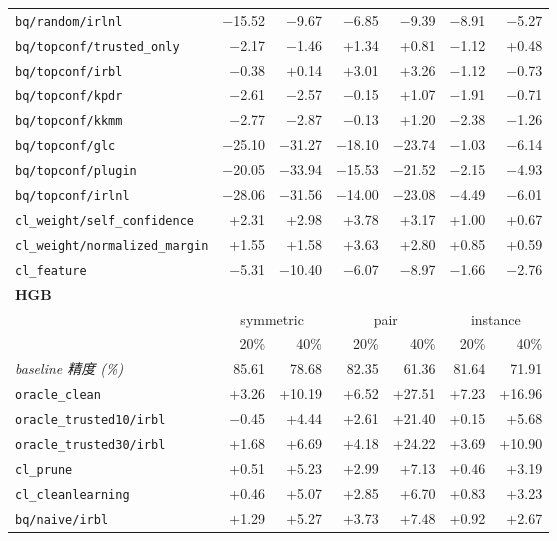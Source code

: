 \begin{tabular}{lrrrrrr}
\texttt{bq/random/irlnl} & $-$15.52 & $-$9.67 & $-$6.85 & $-$9.39 & $-$8.91 & $-$5.27 \\
\texttt{bq/topconf/trusted\_only} & $-$2.17 & $-$1.46 & +1.34 & +0.81 & $-$1.12 & +0.48 \\
\texttt{bq/topconf/irbl} & $-$0.38 & +0.14 & +3.01 & +3.26 & $-$1.12 & $-$0.73 \\
\texttt{bq/topconf/kpdr} & $-$2.61 & $-$2.57 & $-$0.15 & +1.07 & $-$1.91 & $-$0.71 \\
\texttt{bq/topconf/kkmm} & $-$2.77 & $-$2.87 & $-$0.13 & +1.20 & $-$2.38 & $-$1.26 \\
\texttt{bq/topconf/glc} & $-$25.10 & $-$31.27 & $-$18.10 & $-$23.74 & $-$1.03 & $-$6.14 \\
\texttt{bq/topconf/plugin} & $-$20.05 & $-$33.94 & $-$15.53 & $-$21.52 & $-$2.15 & $-$4.93 \\
\texttt{bq/topconf/irlnl} & $-$28.06 & $-$31.56 & $-$14.00 & $-$23.08 & $-$4.49 & $-$6.01 \\
\texttt{cl\_weight/self\_confidence} & +2.31 & +2.98 & +3.78 & +3.17 & +1.00 & +0.67 \\
\texttt{cl\_weight/normalized\_margin} & +1.55 & +1.58 & +3.63 & +2.80 & +0.85 & +0.59 \\
\texttt{cl\_feature} & $-$5.31 & $-$10.40 & $-$6.07 & $-$8.97 & $-$1.66 & $-$2.76 \\
\midrule
\multicolumn{7}{l}{\textbf{HGB}} \\
 & \multicolumn{2}{c}{symmetric} & \multicolumn{2}{c}{pair} & \multicolumn{2}{c}{instance} \\
\cmidrule(lr){2-3} \cmidrule(lr){4-5} \cmidrule(lr){6-7}
 & 20\% & 40\% & 20\% & 40\% & 20\% & 40\% \\
\midrule
\textit{baseline 精度 (\%)} & 85.61 & 78.68 & 82.35 & 61.36 & 81.64 & 71.91 \\
\addlinespace
\texttt{oracle\_clean} & +3.26 & +10.19 & +6.52 & +27.51 & +7.23 & +16.96 \\
\texttt{oracle\_trusted10/irbl} & $-$0.45 & +4.44 & +2.61 & +21.40 & +0.15 & +5.68 \\
\texttt{oracle\_trusted30/irbl} & +1.68 & +6.69 & +4.18 & +24.22 & +3.69 & +10.90 \\
\texttt{cl\_prune} & +0.51 & +5.23 & +2.99 & +7.13 & +0.46 & +3.19 \\
\texttt{cl\_cleanlearning} & +0.46 & +5.07 & +2.85 & +6.70 & +0.83 & +3.23 \\
\texttt{bq/naive/irbl} & +1.29 & +5.27 & +3.73 & +7.48 & +0.92 & +2.67 \\

\end{tabular}
